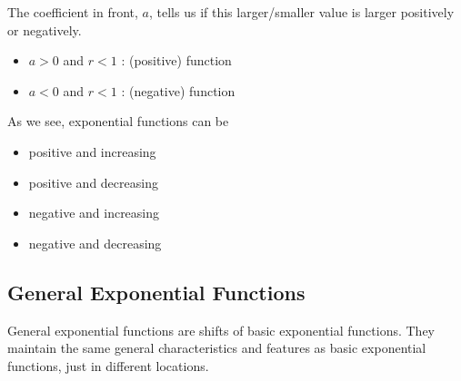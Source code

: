 \documentclass{ximera}
\begin{document}
\begin{observation}
The coefficient in front, $a$, tells us if this larger/smaller value is larger positively or negatively.


\begin{itemize}
\item $a > 0$ and $r < 1$ :   (positive) function
\item $a < 0$ and $r < 1$ :   (negative) function  
\end{itemize}



\end{observation}




As we see, exponential functions can be

\begin{itemize}
\item positive and increasing
\item positive and decreasing
\item negative and increasing
\item negative and decreasing
\end{itemize}








\subsection{General Exponential Functions}


General exponential functions are shifts of basic exponential functions.  They maintain the same general characteristics and features as basic exponential functions, just in different locations.
\end{document}
